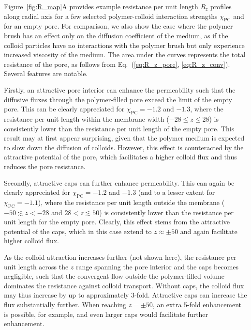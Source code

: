 \documentclass[12pt, a4paper]{article}
\begin{document}
Figure~\ref{fig:R_map}A provides example resistance per unit length $R_z$ profiles along radial axis for a few selected polymer-colloid interaction strengths $\chi_{\textrm{PC}}$ and for an empty pore.
For comparison, we also show the case where the polymer brush has an effect only on the diffusion coefficient of the medium, as if the colloid particles have no interactions with the polymer brush but only experience increased viscosity of the medium.
The area under the curves represents the total resistance of the pore, as follows from Eq.~(\ref{eq:R_z_pore}, \ref{eq:R_z_conv}).
Several features are notable. 

Firstly, an attractive pore interior can enhance the permeability such that the diffusive fluxes through the polymer-filled pore exceed the limit of the empty pore.
This can be clearly appreciated for $\chi_{\textrm{PC}} = -1.2$ and $-1.3$, where the resistance per unit length within the membrane width ($-28 \leq z \leq 28$) is consistently lower than the resistance per unit length of the empty pore.
This result may at first appear surprising, given that the polymer medium is expected to slow down the diffusion of colloids.
However, this effect is counteracted by the attractive potential of the pore, which facilitates a higher colloid flux and thus reduces the pore resistance.

Secondly, attractive caps can further enhance permeability.
This can again be clearly appreciated for $\chi_{\textrm{PC}} = -1.2$ and $-1.3$ (and to a lesser extent for $\chi_{\textrm{PC}} = -1.1$), where the resistance per unit length outside the membrane ($-50 \lesssim z < -28$ and $28 < z \lesssim 50$) is consistently lower than the resistance per unit length for the empty pore. 
Clearly, this effect stems from the attractive potential of the caps, which in this case extend to $z \approx \pm 50$ and again facilitate higher colloid flux. 

As the colloid attraction increases further (not shown here), the resistance per unit length across the $z$ range spanning the pore interior and the caps becomes negligible, such that the convergent flow outside the polymer-filled volume dominates the resistance against colloid transport.
Without caps, the colloid flux may thus increase by up to approximately 3-fold. 
Attractive caps can increase the flux substantially further.
When reaching $z = \pm 50$, an extra 5-fold enhancement is possible, for example, and even larger caps would facilitate further enhancement.
\end{document}
